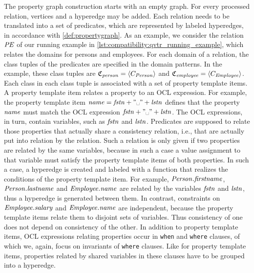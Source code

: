 The property graph construction starts with an empty graph.
For every processed \qvtr relation, vertices and a hyperedge may be added.
Each \qvtr relation needs to be translated into a set of predicates, which are represented by labeled hyperedges, in accordance with \autoref{def:propertygraph}.
As an example, we consider the relation $\mathit{PE}$ of our running example in \autoref{lst:compatibility:qvtr_running_example}, which relates the domains for persons and employees.
For each domain of a relation, the class tuples of the predicates are specified in the domain patterns.
In the example, these class tuples are $\classtuple{C}{\mathvariable{person}} = \tupled{\class{C}{\mathvariable{Person}}}$ and $\classtuple{C}{\mathvariable{employee}} = \tupled{\class{C}{\mathvariable{Employee}}}$.
Each class in each class tuple is associated with a set of property template items.
A property template item relates a property to an \gls{OCL} expression. 
For example, the property template item $\mathvariable{name} = \mathvariable{fstn} + "\text{\textvisiblespace}" + \mathvariable{lstn}$ defines that the property $\mathit{name}$ must match the \gls{OCL} expression $\mathvariable{fstn} + "\text{\textvisiblespace}" + \mathvariable{lstn}$.
The \gls{OCL} expressions, in turn, contain \qvtr variables, such as $\mathit{fstn}$ and $\mathit{lstn}$.
Predicates are supposed to relate those properties that actually share a consistency relation, i.e., that are actually put into relation by the \qvtr relation.
Such a relation is only given if two properties are related by the same \qvtr variables, because in such a case a value assignment to that variable must satisfy the property template items of both properties.
In such a case, a hyperedge is created and labeled with a function that realizes the conditions of the property template item.
For example, $\mathit{Person.firstname}$, $\mathit{Person.lastname}$ and $\mathit{Employee.name}$ are related by the \qvtr variables $\mathit{fstn}$ and $\mathit{lstn}$, thus a hyperedge is generated between them.
In contrast, constraints on $\mathit{Employee.salary}$ and $\mathit{Employee.name}$ are independent, because the property template items relate them to disjoint sets of \qvtr variables. %
Thus consistency of one does not depend on consistency of the other.
In addition to property template items, \gls{OCL} expressions relating properties occur in \texttt{when} and \texttt{where} clauses, of which we, again, focus on invariants of \texttt{where} clauses.
Like for property template items, properties related by shared \qvtr variables in these clauses have to be grouped into a hyperedge.


